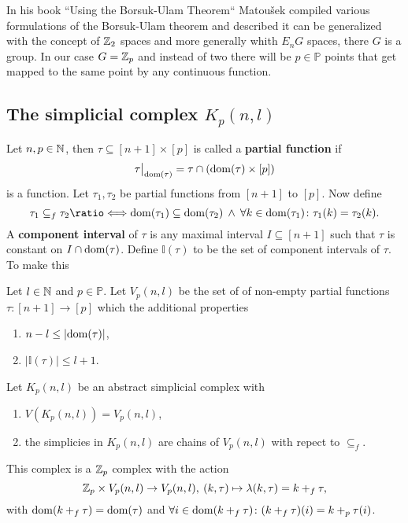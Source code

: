 In his book ``Using the Borsuk-Ulam Theorem`` \cite{using2003} Matoušek compiled various formulations of the Borsuk-Ulam theorem and described it can be generalized with the concept of $\mathbb{Z}_2$ spaces and more generally whith $E_nG$ spaces, there $G$ is a group. In our case $G = \mathbb{Z}_p$ and instead of two there will be $p \in \mathbb{P}$ points that get mapped to the same point by any continuous function. 

\subsection{The simplicial complex $K_p(n, l)$}

\begin{defin}
  Let $n, p \in \mathbb{N}$, then $\tau \subseteq [n+1] \times [p]$ is called a \textbf{partial function} if \[\restr{\tau}{\dom(\tau)} = \tau \cap (\dom(\tau) \times [p])\] is a function. Let $\tau_1, \tau_2$ be partial functions from $[n+1]$ to $[p]$. Now define
  \begin{equation*}
    \tau_1 \subseteq_f \tau_2 \longeq \dom(\tau_1) \subseteq \dom(\tau_2) \: \land \: \forall k \in \dom(\tau_1)\colon \tau_1(k) = \tau_2(k).
  \end{equation*}
  A \textbf{component interval} of $\tau$ is any maximal interval $I \subseteq [n+1]$ such that $\tau$ is constant on $I \cap {\rm dom}(\tau)$. Define $\mathbb{I}(\tau)$ to be the set of component intervals of $\tau$. To make this
\end{defin}

\begin{defin}
  Let $l \in \mathbb{N}$ and $p \in \mathbb{P}$. Let $V_p(n, l)$ be the set of of non-empty partial functions $\tau\colon [n+1] \to [p]$ which the additional properties
  \begin{enumerate}[label=\roman*.)]
    \item $n - l \leq |{\rm dom}(\tau)|$,
    \item $\left|\mathbb{I}(\tau)\right| \leq l+1$.
  \end{enumerate}
\end{defin}

\begin{defin}\label{defin:kpnl}
  Let $K_p(n,l)$ be an abstract simplicial complex with
  \begin{enumerate}[label=\roman*.)]
    \item $V(K_p(n,l)) = V_p(n,l)$,
    \item the simplicies in $K_p(n,l)$ are chains of $V_p(n,l)$ with repect to $\subseteq_f$.
  \end{enumerate}
  This complex is a $\mathbb{Z}_p$ complex with the action
  \begin{equation*}
    \mathbb{Z}_p \times V_p(n,l) \to V_p(n,l), \: (k, \tau) \mapsto \lambda(k, \tau) = k +_f \tau,
  \end{equation*}
  with ${\rm dom}(k +_f \tau) = {\rm dom}(\tau)$ and $\forall i\in {\rm dom}(k +_f \tau)\colon (k+_f\tau)(i) = k +_p \tau(i)$.
\end{defin}

